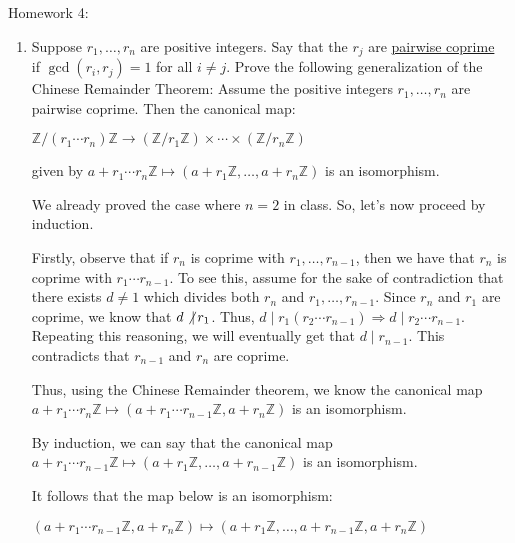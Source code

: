\documentclass{book}
\newcommand{\exOne}{%
   \color{Purple}%
   \fontsize{13}{15}\selectfont%
}
\newenvironment{myIndent}{%
   \begin{adjustwidth}{2.5em}{0em}%
}{%
   \end{adjustwidth}%
}
\newcommand{\udefine}[1]{{%
   \setulcolor{Red}%
   \setul{0.14em}{0.07em}%
   \ul{#1}%
}}
\newcommand{\divides}{\mathop{\mid}}
\newcommand{\retTwo}{\hfill\bigbreak}
\newcommand{\mHeader}[1]{{
   \color{Black}%
   \fontsize{20}{18}\selectfont%
   #1\retTwo
}}
\begin{document}
\mHeader{Homework 4:}


\begin{enumerate}
	\item Suppose $r_1, \ldots, r_n$ are positive integers. Say that the $r_j$ are \udefine{pairwise coprime}\\ if $\gcd(r_i, r_j) = 1$ for all $i \neq j$. Prove the following generalization of the\\ Chinese Remainder Theorem: Assume the positive integers $r_1, \ldots, r_n$ are\\ pairwise coprime. Then the canonical map:
	
	{\centering $\mathbb{Z} / (r_1\cdots r_n)\mathbb{Z} \longrightarrow (\mathbb{Z} / r_1\mathbb{Z}) \times \cdots \times (\mathbb{Z} / r_n\mathbb{Z})$\par}

	given by $a + r_1\cdots r_n\mathbb{Z} \mapsto (a + r_1\mathbb{Z}, \ldots, a + r_n\mathbb{Z})$ is an isomorphism.

	\begin{myIndent}\exOne
		We already proved the case where $n = 2$ in class. So, let's now proceed by induction.\retTwo

		Firstly, observe that if $r_n$ is coprime with $r_1, \ldots, r_{n-1}$, then we have that $r_n$ is coprime with $r_1 \cdots r_{n-1}$. To see this, assume for the sake of contradiction that there exists $d \neq 1$ which divides both $r_n$ and $r_1, \ldots, r_{n-1}$. Since $r_n$ and $r_1$ are coprime, we know that $d \not\divides r_1$. Thus, $d \divides r_1 (r_2\cdots r_{n-1}) \Longrightarrow d \divides r_2 \cdots r_{n-1}$.\\ Repeating this reasoning, we will eventually get that $d \divides r_{n-1}$. This contradicts that $r_{n-1}$ and $r_n$ are coprime.\retTwo

		Thus, using the Chinese Remainder theorem, we know the canonical map\\ $a + r_1\cdots r_{n}\mathbb{Z} \mapsto (a + r_1\cdots r_{n-1}\mathbb{Z}, a + r_n\mathbb{Z})$ is an isomorphism.\retTwo

		By induction, we can say that the canonical map\\ $a + r_1\cdots r_{n-1}\mathbb{Z} \mapsto (a + r_1\mathbb{Z}, \ldots, a + r_{n-1}\mathbb{Z})$ is an isomorphism.\retTwo
		
		It follows that the map below is an isomorphism:

		{\centering $(a + r_1\cdots r_{n-1}\mathbb{Z}, a + r_n\mathbb{Z}) \mapsto (a + r_1\mathbb{Z}, \ldots, a + r_{n-1}\mathbb{Z}, a + r_n\mathbb{Z})$ \retTwo\par}


\end{myIndent}
\end{enumerate}
\end{document}
